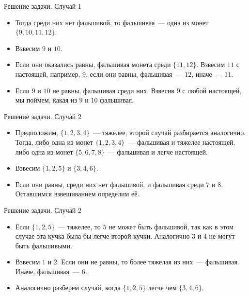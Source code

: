 \begin{frame}[t]{Решение задачи. Случай 1}
\begin{itemize}
    \item Тогда среди них нет фальшивой, то фальшивая~--- одна из монет $\{9, 10, 11, 12\}$.
    \item Взвесим $9$ и $10$.
    \item Если они оказались равны, фальшивая монета среди $\{11, 12\}$.
    Взвесим $11$ с настоящей, например, $9$, если они равны, фальшивая~--- $12$, иначе~--- $11$.
    \item Если $9$ и $10$ не равны, фальшивая среди них. Взвесив $9$ с любой настоящей, мы поймем, какая из $9$ и $10$ фальшивая.
\end{itemize}
\end{frame}


\begin{frame}[t]{Решение задачи. Случай 2}
\begin{itemize}
    \item Предположим, $\{1, 2, 3, 4\}$~--- тяжелее, второй случай разбирается аналогично. Тогда, либо одна из монет $\{1, 2, 3, 4\}$~--- фальшивая и тяжелее настоящей, 
    либо одна из монет $\{5, 6, 7, 8\}$~--- фальшивая и легче настоящей.
    \item Взвесим $\{1, 2, 5\}$ и $\{3, 4, 6\}$.
    \item Если они равны, среди них нет фальшивой, и фальшивая среди $7$ и $8$. Оставшимся взвешиванием определим её.
\end{itemize}
\end{frame}

\begin{frame}[t]{Решение задачи. Случай 2}
\begin{itemize}
    \item Если $\{1, 2, 5\}$~--- тяжелее, то $5$ не может быть фальшивой, так как в этом случае эта кучка была бы легче второй кучки. Аналогично $3$ и $4$ не могут быть фальшивыми.
    \item Взвесим $1$ и $2$. Если они не равны, то более тяжелая из них~--- фальшивая. Иначе, фальшивая~--- $6$.
    \item Аналогично разберем случай, когда $\{1, 2, 5\}$ легче чем $\{3, 4, 6\}$.
\end{itemize}
\end{frame}